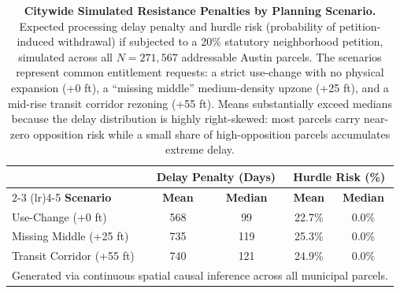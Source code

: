 \begin{table}[H]
\centering
\caption[Citywide Simulated Resistance Penalties]{\textbf{Citywide Simulated Resistance Penalties by Planning Scenario.} Expected processing delay penalty and hurdle risk (probability of petition-induced withdrawal) if subjected to a 20\% statutory neighborhood petition, simulated across all $N=271,567$ addressable Austin parcels. The scenarios represent common entitlement requests: a strict use-change with no physical expansion (+0 ft), a ``missing middle'' medium-density upzone (+25 ft), and a mid-rise transit corridor rezoning (+55 ft). Means substantially exceed medians because the delay distribution is highly right-skewed: most parcels carry near-zero opposition risk while a small share of high-opposition parcels accumulates extreme delay.}
\label{tab:citywide_simulation}
\begin{tabular}{l cc cc}
\toprule
& \multicolumn{2}{c}{\textbf{Delay Penalty (Days)}} & \multicolumn{2}{c}{\textbf{Hurdle Risk (\%)}} \\
\cmidrule(lr){2-3} \cmidrule(lr){4-5}
\textbf{Scenario} & \textbf{Mean} & \textbf{Median} & \textbf{Mean} & \textbf{Median} \\
\midrule
Use-Change (+0 ft) & 568 & 99 & 22.7\% & 0.0\% \\
Missing Middle (+25 ft) & 735 & 119 & 25.3\% & 0.0\% \\
Transit Corridor (+55 ft) & 740 & 121 & 24.9\% & 0.0\% \\
\bottomrule
\multicolumn{5}{l}{\footnotesize Generated via continuous spatial causal inference across all municipal parcels.}\\
\end{tabular}
\end{table}
